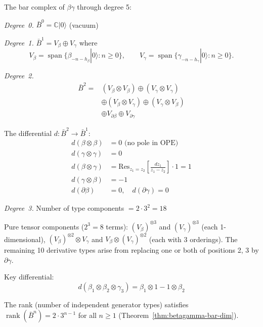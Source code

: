 \begin{theorem}
\label{thm:betagamma-complete-bar}
The bar complex of $\beta\gamma$ through degree 5:

\emph{Degree~0.} $\bar{B}^0 = \mathbb{C}|0\rangle$ (vacuum)

\emph{Degree~1.} $\bar{B}^1 = V_\beta \oplus V_\gamma$ where
\[
V_\beta = \operatorname{span}\{\beta_{-n-h_\beta}|0\rangle : n \geq 0\},
\qquad
V_\gamma = \operatorname{span}\{\gamma_{-n-h_\gamma}|0\rangle : n \geq 0\}.
\]

\emph{Degree~2.}
\begin{align}
\bar{B}^2 = &(V_\beta \otimes V_\beta) \oplus (V_\gamma \otimes V_\gamma) \\
&\oplus (V_\beta \otimes V_\gamma) \oplus (V_\gamma \otimes V_\beta) \\
&\oplus V_{\partial\beta} \oplus V_{\partial\gamma}
\end{align}

The differential $d: \bar{B}^2 \to \bar{B}^1$:
\begin{align}
d(\beta \otimes \beta) &= 0 \text{ (no pole in OPE)} \\
d(\gamma \otimes \gamma) &= 0 \\
d(\beta \otimes \gamma) &= \text{Res}_{z_1=z_2}\left[\frac{dz_1}{z_1-z_2}\right] \cdot 1 = 1 \\
d(\gamma \otimes \beta) &= -1 \\
d(\partial\beta) &= 0, \quad d(\partial\gamma) = 0
\end{align}

\emph{Degree~3.} Number of type components $= 2 \cdot 3^2 = 18$

Pure tensor components ($2^3 = 8$ terms): $(V_\beta)^{\otimes 3}$ and $(V_\gamma)^{\otimes 3}$ (each 1-dimensional), $(V_\beta)^{\otimes 2} \otimes V_\gamma$ and $V_\beta \otimes (V_\gamma)^{\otimes 2}$ (each with 3 orderings).  The remaining 10 derivative types arise from replacing one or both of positions 2, 3 by $\partial\gamma$.

Key differential:
\[d(\beta_1 \otimes \beta_2 \otimes \gamma_3) = \beta_1 \otimes 1 - 1 \otimes \beta_2\]

The rank (number of independent generator types) satisfies $\operatorname{rank}(\bar{B}^n) = 2 \cdot 3^{n-1}$ for all $n \geq 1$ (Theorem~\ref{thm:betagamma-bar-dim}).
\end{theorem}

